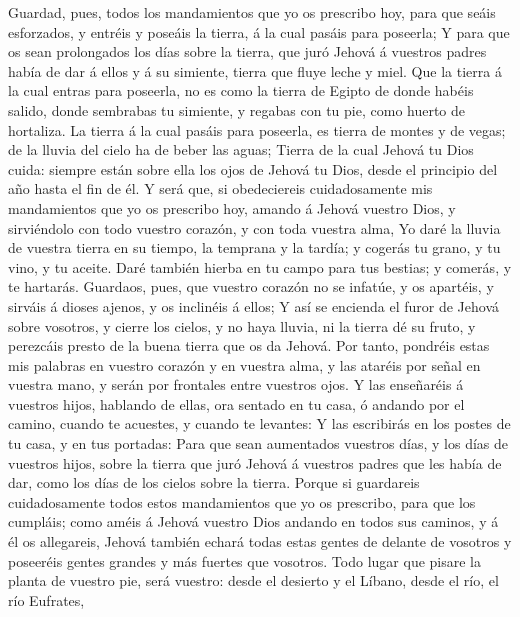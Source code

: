 Guardad, pues, todos los mandamientos que yo os prescribo
hoy, para que seáis esforzados, y entréis y poseáis la tierra, á la cual
pasáis para poseerla;  Y para que os sean prolongados los
días sobre la tierra, que juró Jehová á vuestros padres había de dar á
ellos y á su simiente, tierra que fluye leche y miel.  Que
la tierra á la cual entras para poseerla, no es como la tierra de Egipto
de donde habéis salido, donde sembrabas tu simiente, y regabas con tu
pie, como huerto de hortaliza.  La tierra á la cual pasáis
para poseerla, es tierra de montes y de vegas; de la lluvia del cielo ha
de beber las aguas;  Tierra de la cual Jehová tu Dios
cuida: siempre están sobre ella los ojos de Jehová tu Dios, desde el
principio del año hasta el fin de él.  Y será que, si
obedeciereis cuidadosamente mis mandamientos que yo os prescribo hoy,
amando á Jehová vuestro Dios, y sirviéndolo con todo vuestro corazón, y
con toda vuestra alma,  Yo daré la lluvia de vuestra tierra
en su tiempo, la temprana y la tardía; y cogerás tu grano, y tu vino, y
tu aceite.  Daré también hierba en tu campo para tus
bestias; y comerás, y te hartarás.  Guardaos, pues, que
vuestro corazón no se infatúe, y os apartéis, y sirváis á dioses ajenos,
y os inclinéis á ellos;  Y así se encienda el furor de
Jehová sobre vosotros, y cierre los cielos, y no haya lluvia, ni la
tierra dé su fruto, y perezcáis presto de la buena tierra que os da
Jehová.  Por tanto, pondréis estas mis palabras en vuestro
corazón y en vuestra alma, y las ataréis por señal en vuestra mano, y
serán por frontales entre vuestros ojos.  Y las enseñaréis
á vuestros hijos, hablando de ellas, ora sentado en tu casa, ó andando
por el camino, cuando te acuestes, y cuando te levantes:  Y
las escribirás en los postes de tu casa, y en tus portadas:
 Para que sean aumentados vuestros días, y los días de
vuestros hijos, sobre la tierra que juró Jehová á vuestros padres que
les había de dar, como los días de los cielos sobre la tierra.
 Porque si guardareis cuidadosamente todos estos
mandamientos que yo os prescribo, para que los cumpláis; como améis á
Jehová vuestro Dios andando en todos sus caminos, y á él os allegareis,
 Jehová también echará todas estas gentes de delante de
vosotros y poseeréis gentes grandes y más fuertes que vosotros.
 Todo lugar que pisare la planta de vuestro pie, será
vuestro: desde el desierto y el Líbano, desde el río, el río Eufrates,
